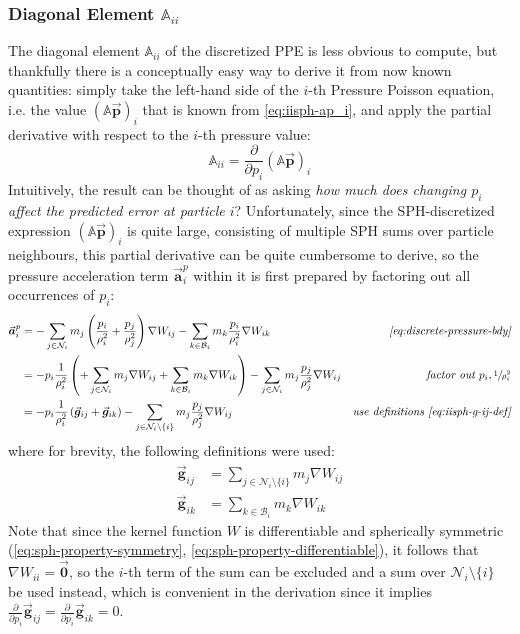 \documentclass[oneside, a4paper]{book}
\newcommand\pdpi[0]{\frac{\partial}{\partial p_i}}
\newcommand\vek[1]{\vec{\bm{#1}}}
\newcommand\br[1]{\left(#1\right)}
\begin{document}
    \subsubsection{Diagonal Element $\mathds{A}_{ii}$}\label{subsec:diagonal-element}
    The diagonal element $\mathds{A}_{ii}$ of the discretized PPE is less obvious to compute, but thankfully there is a conceptually easy way to derive it from now known quantities: simply take the left-hand side of the $i$-th Pressure Poisson equation, i.e. the value $\br{\mathds{A}\vek{p}}_i$ that is known from \autoref{eq:iisph-ap_i}, and apply the partial derivative with respect to the $i$-th pressure value:
    \begin{equation}
      \mathds{A}_{ii} = \pdpi \br{\mathds{A}\vek{p}}_i
    \end{equation}
    Intuitively, the result can be thought of as asking \textit{how much does changing $p_i$ affect the predicted error at particle $i$}? Unfortunately, since the SPH-discretized expression $\br{\mathds{A}\vek{p}}_i$ is quite large, consisting of multiple SPH sums over particle neighbours, this partial derivative can be quite cumbersome to derive, so the pressure acceleration term $\vek{a}_i^p$ within it is first prepared by factoring out all occurrences of $p_i$:
    \begin{align}
      \vek{a}_i^p &= -
      \sum_{j\in\mathcal{N}_i} 
        m_j \br{\frac{p_i}{\rho_i^2} + \frac{p_j}{\rho_j^2}} \nabla W_{ij} 
      -\sum_{k\in\mathcal{B}_i} 
        m_k\frac{p_i}{\rho_i^2} \nabla W_{ik} 
      &\textit{\autoref{eq:discrete-pressure-bdy}}\\
      &= -p_i \frac{1}{\rho_i^2}\br{
        +\sum_{j\in\mathcal{N}_i} 
        m_j \nabla W_{ij} 
        +\sum_{k\in\mathcal{B}_i} 
        m_k \nabla W_{ik} 
      }
      - \sum_{j\in\mathcal{N}_i} 
        m_j\frac{p_j}{\rho_j^2} \nabla W_{ij} 
      &\textit{factor out $p_i, \sfrac{1}{\rho_i^2}$}\\
      \label{eq:iisph-a-i}
      &= -p_i \frac{1}{\rho_i^2}\br{
        \vek{g}_{ij}
        +\vek{g}_{ik}
      }
      - \sum_{j\in\mathcal{N}_i\setminus \{i\}} 
        m_j\frac{p_j}{\rho_j^2} \nabla W_{ij} 
      &\textit{use definitions \autoref{eq:iisph-g-ij-def}}
    \end{align}
    where for brevity, the following definitions were used:
    \begin{align}
      \vek{g}_{ij} &= \sum_{j\in\mathcal{N}_i\setminus \{i\}}m_j \nabla W_{ij}\label{eq:iisph-g-ij-def} \\
      \vek{g}_{ik} &= \sum_{k\in\mathcal{B}_i} m_k \nabla W_{ik}
    \end{align}
    Note that since the kernel function $W$ is differentiable and spherically symmetric (\autoref{eq:sph-property-symmetry}, \autoref{eq:sph-property-differentiable}), it follows that $\nabla W_{ii}=\vek{0}$, so the $i$-th term of the sum can be excluded and a sum over $\mathcal{N}_i\setminus \{i\}$ be used instead, which is convenient in the derivation since it implies $\pdpi \vek{g}_{ij} = \pdpi \vek{g}_{ik} = 0$.
\end{document}
